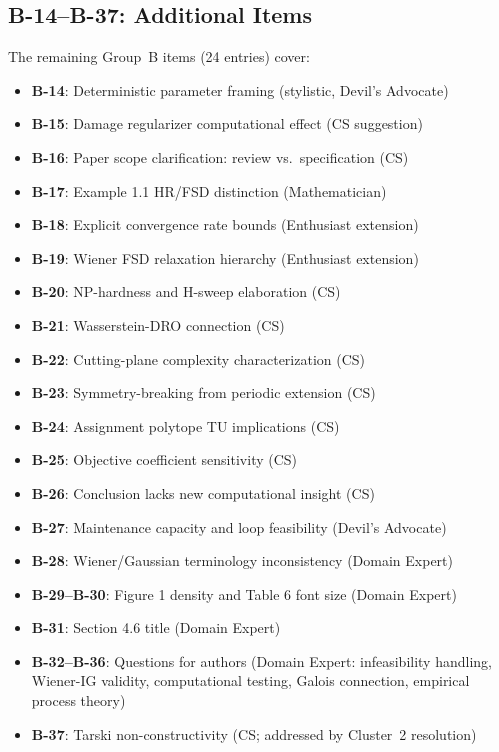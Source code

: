 \documentclass[11pt,a4paper]{article}
\begin{document}
\subsection{B-14--B-37: Additional Items}
The remaining Group~B items (24 entries) cover:
\begin{itemize}[nosep,leftmargin=1.5em]
  \item \textbf{B-14}: Deterministic parameter framing (stylistic, Devil's Advocate)
  \item \textbf{B-15}: Damage regularizer computational effect (CS suggestion)
  \item \textbf{B-16}: Paper scope clarification: review vs.\ specification (CS)
  \item \textbf{B-17}: Example 1.1 HR/FSD distinction (Mathematician)
  \item \textbf{B-18}: Explicit convergence rate bounds (Enthusiast extension)
  \item \textbf{B-19}: Wiener FSD relaxation hierarchy (Enthusiast extension)
  \item \textbf{B-20}: NP-hardness and H-sweep elaboration (CS)
  \item \textbf{B-21}: Wasserstein-DRO connection (CS)
  \item \textbf{B-22}: Cutting-plane complexity characterization (CS)
  \item \textbf{B-23}: Symmetry-breaking from periodic extension (CS)
  \item \textbf{B-24}: Assignment polytope TU implications (CS)
  \item \textbf{B-25}: Objective coefficient sensitivity (CS)
  \item \textbf{B-26}: Conclusion lacks new computational insight (CS)
  \item \textbf{B-27}: Maintenance capacity and loop feasibility (Devil's Advocate)
  \item \textbf{B-28}: Wiener/Gaussian terminology inconsistency (Domain Expert)
  \item \textbf{B-29--B-30}: Figure 1 density and Table 6 font size (Domain Expert)
  \item \textbf{B-31}: Section 4.6 title (Domain Expert)
  \item \textbf{B-32--B-36}: Questions for authors (Domain Expert: infeasibility handling, Wiener-IG validity, computational testing, Galois connection, empirical process theory)
  \item \textbf{B-37}: Tarski non-constructivity (CS; addressed by Cluster~2 resolution)
\end{itemize}
\end{document}
